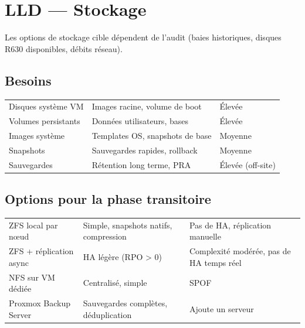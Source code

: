 \chapter{LLD — Stockage}
\label{chap:storage}

\begin{todobox}
Les options de stockage cible dépendent de l'audit (baies historiques, disques R630 disponibles, débits réseau).
\end{todobox}

\section{Besoins}
\begin{xltabular}{\textwidth}{@{}lXl@{}}
\toprule
{} &  &  \\
\midrule
\endhead
\bottomrule
\endfoot
\bottomrule
\endlastfoot
Disques système VM & Images racine, volume de boot & Élevée \\
Volumes persistants & Données utilisateurs, bases & Élevée \\
Images système & Templates OS, snapshots de base & Moyenne \\
Snapshots & Sauvegardes rapides, rollback & Moyenne \\
Sauvegardes & Rétention long terme, PRA & Élevée (off-site) \\

\end{xltabular}

\section{Options pour la phase transitoire}
\begin{xltabular}{\textwidth}{@{}lXX@{}}
\toprule
{} &  &  \\
\midrule
\endhead
\bottomrule
\endfoot
\bottomrule
\endlastfoot
ZFS local par nœud & Simple, snapshots natifs, compression & Pas de HA, réplication manuelle \\
ZFS + réplication async & HA légère (RPO > 0) & Complexité modérée, pas de HA temps réel \\
NFS sur VM dédiée & Centralisé, simple & SPOF \\
Proxmox Backup Server & Sauvegardes complètes, déduplication & Ajoute un serveur \\

\end{xltabular}

